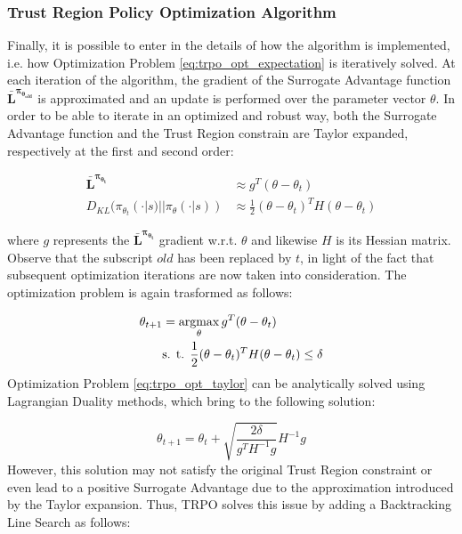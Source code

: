             \subsubsection{Trust Region Policy Optimization Algorithm}
                Finally, it is possible to enter in the details of how the algorithm is implemented, i.e. how Optimization Problem \ref{eq:trpo_opt_expectation} is iteratively solved. At each iteration of the algorithm, the gradient of the Surrogate Advantage function $\mathbf{\bar{L}^{\pi_{\theta_{old}}}}$ is approximated and an update is performed over the parameter vector $\theta$. In order to be able to iterate in an optimized and robust way, both the Surrogate Advantage function and the Trust Region constrain are Taylor expanded, respectively at the first and second order:
                
                \begin{align}
                    \mathbf{\bar{L}^{\pi_{\theta_{t}}}} &\approx g^{T}(\theta - \theta_{t})\\
                    D_{KL} ( \pi_{\theta_{t}}(\cdot|s) || \pi_{\theta} (\cdot|s) ) &\approx \frac{1}{2} (\theta - \theta_{t})^{T}H(\theta - \theta_{t})
                \end{align}
                
                where $g$ represents the $\mathbf{\bar{L}^{\pi_{\theta_{t}}}}$ gradient w.r.t. $\theta$ and likewise $H$ is its Hessian matrix. Observe that the subscript $old$ has been replaced by $t$, in light of the fact that subsequent optimization iterations are now taken into consideration. The optimization problem is again trasformed as follows:
                
                \begin{align}
                    \label{eq:trpo_opt_taylor}
                    \theta_{t+1} &= \operatorname*{argmax}_{\theta} g^{T}(\theta - \theta_{t}) \\
                    & \text{s. t. } \frac{1}{2} (\theta - \theta_{t})^{T}H(\theta - \theta_{t}) \leq \delta \nonumber
                \end{align}
                \noindent
                Optimization Problem \ref{eq:trpo_opt_taylor} can be analytically solved using Lagrangian Duality methods, which bring to the following solution:
                
                \[ \theta_{t+1} = \theta_{t} + \sqrt{\frac{2\delta}{g^{T}H^{-1}g}} H^{-1}g\]
                \noindent
                However, this solution may not satisfy the original Trust Region constraint or even lead to a positive Surrogate Advantage due to the approximation introduced by the Taylor expansion. Thus, TRPO solves this issue by adding a Backtracking Line Search as follows:
                
